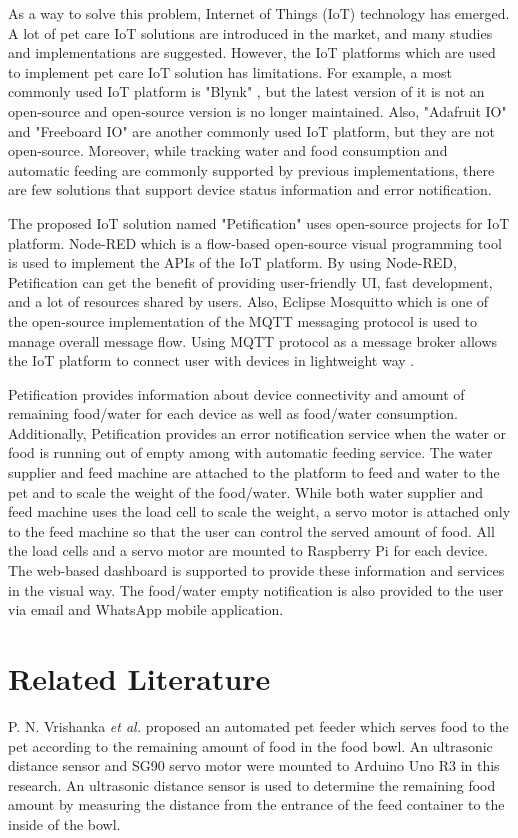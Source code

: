 \documentclass[conference]{IEEEtran}
\begin{document}
As a way to solve this problem, Internet of Things (IoT) technology has emerged. A lot of pet care IoT solutions are introduced in the market, and many studies and implementations are suggested.
However, the IoT platforms which are used to implement pet care IoT solution has limitations. For example, a most commonly used IoT platform is "Blynk" \cite{b2, b3, b4, b5}, but the latest version of it is not an open-source and open-source version is no longer maintained. Also, "Adafruit IO" \cite{b6} and "Freeboard IO" \cite{b7} are another commonly used IoT platform, but they are not open-source.
Moreover, while tracking water and food consumption and automatic feeding are commonly supported by previous implementations, there are few solutions that support device status information and error notification.

The proposed IoT solution named "Petification" uses open-source projects for IoT platform. Node-RED which is a flow-based open-source visual programming tool \cite{b8} is used to implement the APIs of the IoT platform. By using Node-RED, Petification can get the benefit of providing user-friendly UI, fast development, and a lot of resources shared by users. Also, Eclipse Mosquitto which is one of the open-source implementation of the MQTT messaging protocol is used to manage overall message flow. Using MQTT protocol as a message broker allows the IoT platform to connect user with devices in lightweight way \cite{b9}.

Petification provides information about device connectivity and amount of remaining  food/water for each device as well as food/water consumption. Additionally, Petification provides an error notification service when the water or food is running out of empty among with automatic feeding service.
The water supplier and feed machine are attached to the platform to feed and water to the pet and to scale the weight of the food/water. While both water supplier and feed machine uses the load cell to scale the weight, a servo motor is attached only to the feed machine so that the user can control the served amount of food. All the load cells and a servo motor are mounted to Raspberry Pi for each device.
The web-based dashboard is supported to provide these information and services in the visual way. The food/water empty notification is also provided to the user via email and WhatsApp mobile application.

\section{Related Literature}
P. N. Vrishanka \textit{et al.} \cite{b10} proposed an automated pet feeder which serves food to the pet according to the remaining amount of food in the food bowl. An ultrasonic distance sensor and SG90 servo motor were mounted to Arduino Uno R3 in this research. An ultrasonic distance sensor is used to determine the remaining food amount by measuring the distance from the entrance of the feed container to the inside of the bowl.
\end{document}
